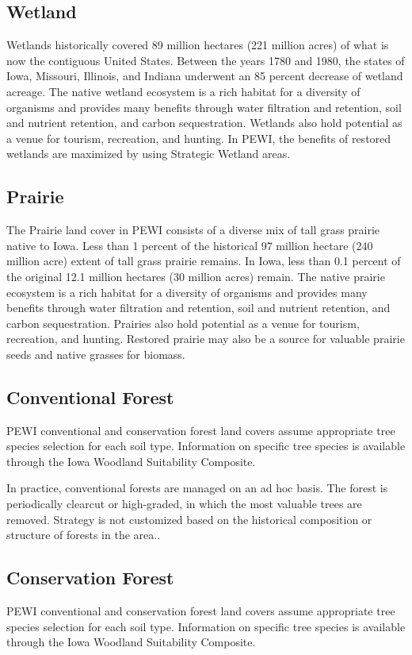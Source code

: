 \documentclass[11pt]{article}
\begin{document}
\subsection{Wetland}
Wetlands historically covered 89 million hectares (221 million acres) of what is now the contiguous United States.\cite{12}  Between the years 1780 and 1980, the states of Iowa, Missouri, Illinois, and Indiana underwent an 85 percent decrease of wetland acreage.\cite{13}  The native wetland ecosystem is a rich habitat for a diversity of organisms and provides many benefits through water filtration and retention, soil and nutrient retention, and carbon sequestration. Wetlands also hold potential as a venue for tourism, recreation, and hunting.\cite{14} In PEWI, the benefits of restored wetlands are maximized by using Strategic Wetland areas.

\subsection{Prairie}
The Prairie land cover in PEWI consists of a diverse mix of tall grass prairie native to Iowa.\cite{15}  Less than 1 percent of the historical 97 million hectare (240 million acre) extent of tall grass prairie remains.\cite{16}  In Iowa, less than 0.1 percent of the original 12.1 million hectares (30 million acres) remain.\cite{17}
The native prairie ecosystem is a rich habitat for a diversity of organisms and provides many benefits through water filtration and retention, soil and nutrient retention, and carbon sequestration. Prairies also hold potential as a venue for tourism, recreation, and hunting.\cite{18}  Restored prairie may also be a source for valuable prairie seeds and native grasses for biomass.
\subsection{Conventional Forest}
PEWI conventional and conservation forest land covers assume appropriate tree species selection for each soil type. Information on specific tree species is available through the Iowa Woodland Suitability Composite.\cite{19}

In practice, conventional forests are managed on an ad hoc basis. The forest is periodically clearcut or high-graded, in which the most valuable trees are removed. Strategy is not customized based on the historical composition or structure of forests in the area.\cite{20}. 


\subsection{Conservation Forest}
	PEWI conventional and conservation forest land covers assume appropriate tree species selection for each soil type. Information on specific tree species is available through the Iowa Woodland Suitability Composite.\cite{21}
\end{document}

